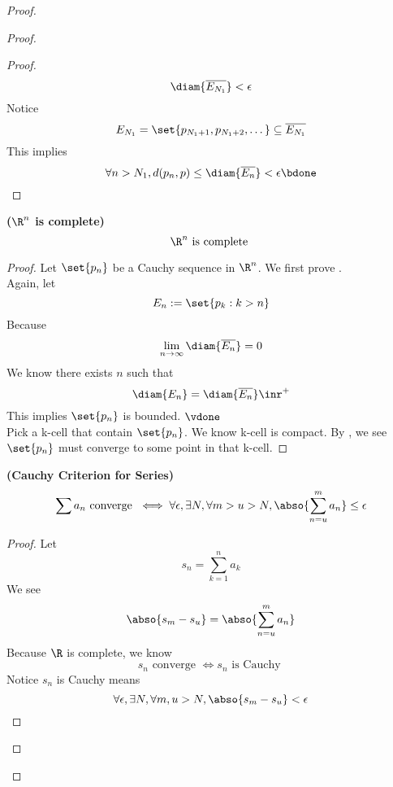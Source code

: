 \documentclass{report}
\begin{document}
\begin{proof}
\begin{proof}
\begin{proof}
\begin{equation*}
\diam{\overline{E_{N_1}}}<\epsilon 
\end{equation*}
Notice
\begin{equation*}
E_{N_1}=\set{p_{N_1+1},p_{N_1+2},\dots }\subseteq \overline{E_{N_1}}
\end{equation*}
This implies 
\begin{equation*}
\forall n>N_1, d(p_n,p)\leq \diam{\overline{E_n}}<\epsilon \bdone
\end{equation*}
\end{proof}
\begin{corollary}
\label{3.10.9}
\textbf{($\R^n$ is complete)}
\begin{equation*}
\R^n\text{ is complete }
\end{equation*}
\end{corollary}
\begin{proof}
Let $\set{p_n}$ be a Cauchy sequence in $\R^n$. We first prove .\\

Again, let
\begin{equation*}
E_n:=\set{p_k:k>n}
\end{equation*}
Because 
\begin{equation*}
\lim_{n\to\infty}\diam{\overline{E_n}}=0
\end{equation*}
We know there exists $n$ such that
 \begin{equation*}
\diam{E_n}=\diam{\overline{E_n}}\inr^+
\end{equation*}
This implies $\set{p_n}$ is bounded. $\vdone$\\

Pick a k-cell that contain $\set{p_n}$. We know k-cell is compact. By , we see $\set{p_n}$ must converge to some point in that k-cell.
\end{proof}
\begin{corollary}
\label{3.10.10}
\textbf{(Cauchy Criterion for Series)}  
\begin{equation*}
\sum a_n\text{ converge }\iff \forall \epsilon ,\exists N, \forall m>u>N, \abso{\sum_{n=u}^m a_n}\leq \epsilon 
\end{equation*}
\end{corollary}
\begin{proof}
Let 
 \begin{equation*}
s_n=\sum_{k=1}^n a_k
\end{equation*}
We see 
\begin{equation*}
  \abso{s_m-s_u}=\abso{\sum_{n=u}^m a_n}
\end{equation*}
Because $\R$ is complete, we know 
 \begin{equation*}
s_n\text{ converge }\iff  s_n\text{ is Cauchy }
\end{equation*}
Notice $s_n$ is Cauchy means 
 \begin{equation*}
\forall \epsilon, \exists N, \forall m,u>N, \abso{s_m-s_u}<\epsilon 
\end{equation*}
\end{proof}

\end{proof}
\end{proof}
\end{document}
